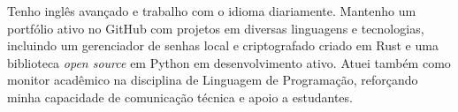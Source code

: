\documentclass{resume}
\begin{document}
Tenho inglês avançado e trabalho com o idioma diariamente. Mantenho um portfólio ativo no GitHub com projetos em diversas linguagens e tecnologias, incluindo um gerenciador de senhas local e criptografado criado em Rust e uma biblioteca \textit{open source} em Python em desenvolvimento ativo. Atuei também como monitor acadêmico na disciplina de Linguagem de Programação, reforçando minha capacidade de comunicação técnica e apoio a estudantes.
\\
\\
\end{document}
